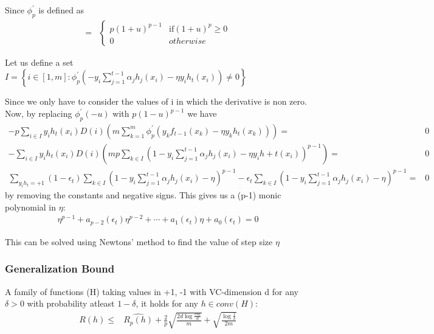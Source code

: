 \documentclass{article}
\begin{document}
Since $\phi^{'}_{p}$ is defined as 
\begin{align*}
  =& \begin{cases}
  p{(1+u)}^{p-1} & \mathrm{if } {(1+u)}^{p} \ge 0 \\
  0 & otherwise
     \end{cases}
\end{align*}

Let us define a set \( I =  \left\{ i \in [1,m] : \phi^{'}_{p}\left( -y_{i}\sum_{j=1}^{t-1} \alpha_{j}h_{j}(x_{i}) - \eta y_{i}h_{t}(x_{i}) \right) \ne 0\right\} \)

Since we  only have to consider the values of i in which the derivative is non zero.  Now, by replacing $\phi^{'}_{p}(-u)$ with $p{(1-u)}^{p-1} $ we have
\begin{align*}
  -p\sum_{i \in I}y_{i}h_{t}(x_{i})D(i)\left(m\sum_{k=1}^{m}\phi^{'}_{p}(y_{k}f_{t-1}(x_{k}) - \eta y_{k}h_{t}(x_{k}) )\right) = & 0 \\
  -\sum_{i \in I} y_{i}h_{t}(x_{i}) D(i) \left( mp\sum_{k\in I}{\left( 1 - y_{i}\sum_{j=1}^{t-1} \alpha_{j}h_{j}(x_{i}) - \eta y_{i}h+{t}(x_{i}) \right)}^{p-1} \right) = & 0 \\
  \sum_{y_{i}h_{t} = +1} (1 - \epsilon_{t})\sum_{k \in I} {\left( 1 - y_{i}\sum_{j=1}^{t-1} \alpha_{j}h_{j}(x_{i}) - \eta \right)}^{p-1} - \epsilon_{t} \sum_{k \in I}  {\left( 1 - y_{i}\sum_{j=1}^{t-1} \alpha_{j}h_{j}(x_{i}) - \eta \right)}^{p-1} = & 0
\end{align*}
by removing the constants and negative signs.  This gives us a (p-1) monic polynomial in $\eta$: 
\begin{align*}
  \eta^{p-1} + a_{p-2}(\epsilon_{t})\eta^{p-2} + \cdots + a_{1}(\epsilon_{t})\eta + a_{0}(\epsilon_{t}) = 0
\end{align*}

This can be solved using Newtons' method to find the value of step size $\eta$



\subsubsection*{Generalization Bound}
A family of functions (H) taking values in {+1, -1} with VC-dimension d for any $ \delta > 0 $ with probability atleast $ 1 - \delta $, it holds for any $h \in conv(H)$:
\begin{align*}
  R(h) \le & \hat{R_{p}(h)} + \frac{2}{p} \sqrt{\frac{2d\log{\frac{em}{d}}}{m}} + \sqrt{\frac{\log{\frac{1}{\delta}}}{2m}}
\end{align*}
\end{document}
